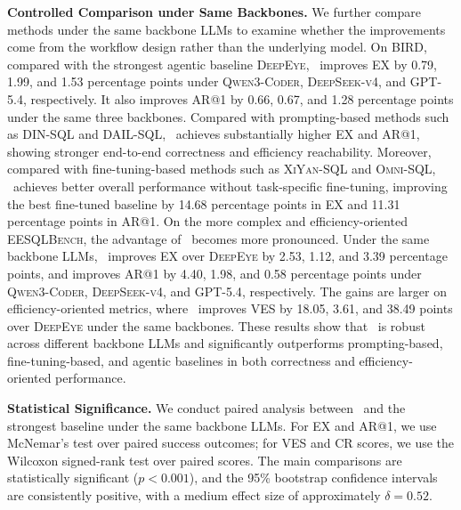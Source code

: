 \textbf{Controlled Comparison under Same Backbones.}
We further compare methods under the same backbone LLMs to examine whether the improvements come from the workflow design rather than the underlying model.
On \textsc{BIRD}, 
compared with the strongest agentic baseline \textsc{DeepEye}, \toolname\ improves EX by 0.79, 1.99, and 1.53 percentage points under \textsc{Qwen3-Coder}, \textsc{DeepSeek-v4}, and \textsc{GPT-5.4}, respectively.
It also improves AR@1 by 0.66, 0.67, and 1.28 percentage points under the same three backbones.
Compared with prompting-based methods such as \textsc{DIN-SQL} and \textsc{DAIL-SQL}, \toolname\ achieves substantially higher EX and AR@1, showing stronger end-to-end correctness and efficiency reachability.
Moreover, compared with fine-tuning-based methods such as \textsc{XiYan-SQL} and \textsc{Omni-SQL}, \toolname\ achieves better overall performance without task-specific fine-tuning, improving the best fine-tuned baseline by 14.68 percentage points in EX and 11.31 percentage points in AR@1.
%
On the more complex and efficiency-oriented \textsc{EESQLBench}, the advantage of \toolname\ becomes more pronounced.
Under the same backbone LLMs, \toolname\ improves EX over \textsc{DeepEye} by 2.53, 1.12, and 3.39 percentage points, and improves AR@1 by 4.40, 1.98, and 0.58 percentage points under \textsc{Qwen3-Coder}, \textsc{DeepSeek-v4}, and \textsc{GPT-5.4}, respectively.
The gains are larger on efficiency-oriented metrics, where \toolname\ improves VES by 18.05, 3.61, and 38.49 points over \textsc{DeepEye} under the same backbones.
These results show that \toolname\ is robust across different backbone LLMs and significantly outperforms prompting-based, fine-tuning-based, and agentic baselines in both correctness and efficiency-oriented performance.


\textbf{Statistical Significance.}
We conduct paired analysis between \toolname\ and the strongest baseline under the same backbone LLMs.
For EX and AR@1, we use McNemar's test over paired success outcomes; for VES and CR scores, we use the Wilcoxon signed-rank test over paired scores.
The main comparisons are statistically significant ($p < 0.001$), and the 95\% bootstrap confidence intervals are consistently positive, with a medium effect size of approximately $\delta=0.52$.

